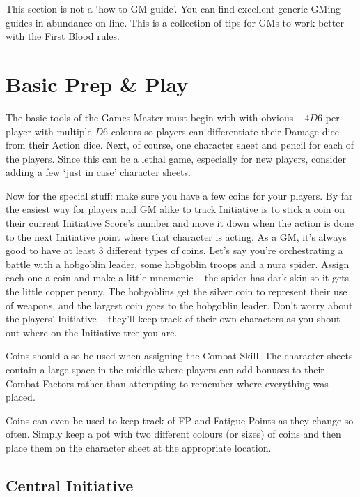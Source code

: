 
This section is not a `how to GM guide'.  You can find excellent generic GMing guides in abundance on-line.  This is a collection of tips for GMs to work better with the First Blood rules.

\section{Basic Prep \& Play}

The basic tools of the Games Master must begin with with obvious -- $4D6$ per player with multiple $D6$ colours so players can differentiate their Damage dice from their Action dice.  Next, of course, one character sheet and pencil for each of the players.  Since this can be a lethal game, especially for new players, consider adding a few `just in case' character sheets.

Now for the special stuff: make sure you have a few coins for your players.  By far the easiest way for players and GM alike to track Initiative is to stick a coin on their current Initiative Score's number and move it down when the action is done to the next Initiative point where that character is acting.  As a GM, it's always good to have at least 3 different types of coins.  Let's say you're orchestrating a battle with a hobgoblin leader, some hobgoblin troops and a nura spider. Assign each one a coin and make a little mnemonic -- the spider has dark skin so it gets the little copper penny.  The hobgoblins get the silver coin to represent their use of weapons, and the largest coin goes to the hobgoblin leader.  Don't worry about the players' Initiative -- they'll keep track of their own characters as you shout out where on the Initiative tree you are.

Coins should also be used when assigning the Combat Skill.  The character sheets contain a large space in the middle where players can add bonuses to their Combat Factors rather than attempting to remember where everything was placed.

Coins can even be used to keep track of FP and Fatigue Points as they change so often.  Simply keep a pot with two different colours (or sizes) of coins and then place them on the character sheet at the appropriate location.

\subsection{Central Initiative}

